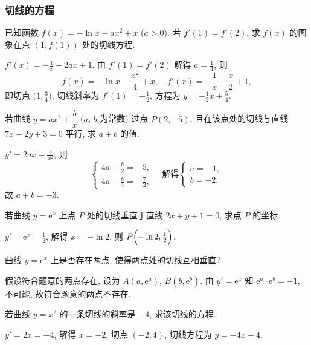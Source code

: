   \subsubsection{切线的方程}
  \begin{example}
    已知函数 $f(x)=-\ln x -ax^2 +x$ ($a>0$). 若 $f'(1)=f'(2)$, 
    求 $f(x)$ 的图象在点 $(1,f(1))$ 处的切线方程.
  \end{example}

  \beginsolution
    $f'(x)=-\frac1x-2ax+1$. 由 $f'(1)=f'(2)$ 解得 $a=\frac14$, 则
    \[f(x)=-\ln x-\frac{x^2}4+x,\quad f'(x)=-\frac1x-\frac{x}2+1,\]
    即切点 $\Big(1,\frac34\Big)$, 切线斜率为 $f'(1)=-\frac12$, 方程为 $y=-\frac12x+\frac54$.
  \endsolution
  
  \begin{example}
    若曲线 $y=ax^2 +\dfrac{b}x$ ($a$, $b$ 为常数) 过点 $P(2,-5)$, 
    且在该点处的切线与直线 $7x+2y+3=0$ 平行, 求 $a+b$ 的值.
  \end{example}

  \beginsolution
    $y'=2ax-\frac{b}{x^2}$, 则
    \[\left\{\!\!\begin{array}{l}
        4a+\frac{b}2=-5,\\[5pt]
        4a-\frac{b}4=-\frac72,\end{array}\right.\quad
        \text{解得}
      \left\{\!\!\begin{array}{l}
        a=-1,\\
        b=-2,\end{array}\right.\]
    故 $a+b=-3$.
  \endsolution
  
  \lianxi
  \begin{exercise}
    若曲线 $y=\mathrm{e}^x$ 上点 $P$ 处的切线垂直于直线 $2x+y+1=0$, 
    求点 $P$ 的坐标.
  \end{exercise}

  \beginsolution
    $y'=\mathrm{e}^x=\frac12$, 解得 $x=-\ln2$, 则 $P\Bigl(-\ln2,\frac12\Bigr)$.
    
    \varexercise 曲线 $y=\mathrm{e}^x$ 上是否存在两点, 使得两点处的切线互相垂直?
    
    假设符合题意的两点存在, 设为 $A(a,\mathrm{e}^a)$, $B(b,\mathrm{e}^b)$. 由 $y'=\mathrm{e}^x$ 知 $\mathrm{e}^a\cdot\mathrm{e}^b=-1$, 不可能, 故符合题意的两点不存在.
  \endsolution
  
  \begin{exercise}
    若曲线 $y=x^2$ 的一条切线的斜率是 $-4$, 求该切线的方程.
  \end{exercise}

  \beginsolution
    $y'=2x=-4$, 解得 $x=-2$, 切点 $(-2,4)$, 切线方程为 $y=-4x-4$.
    
